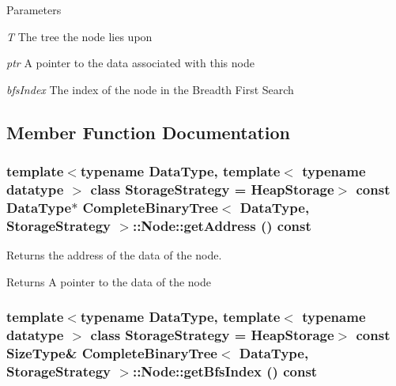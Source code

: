 \begin{DoxyParams}{Parameters}
\item[{\em T}]The tree the node lies upon \item[{\em ptr}]A pointer to the data associated with this node \item[{\em bfsIndex}]The index of the node in the Breadth First Search \end{DoxyParams}


\subsection{Member Function Documentation}
\hypertarget{class_complete_binary_tree_1_1_node_a78c55b78241e27d27361b250cf77deb8}{
\subsubsection[{getAddress}]{\setlength{\rightskip}{0pt plus 5cm}template$<$typename DataType, template$<$ typename datatype $>$ class StorageStrategy = HeapStorage$>$ const DataType$\ast$ {\bf CompleteBinaryTree}$<$ DataType, StorageStrategy $>$::Node::getAddress () const}}
\label{class_complete_binary_tree_1_1_node_a78c55b78241e27d27361b250cf77deb8}


Returns the address of the data of the node. 

\begin{DoxyReturn}{Returns}
A pointer to the data of the node 
\end{DoxyReturn}
\hypertarget{class_complete_binary_tree_1_1_node_a5d57f8452e31eb8680fb186655b840c3}{
\subsubsection[{getBfsIndex}]{\setlength{\rightskip}{0pt plus 5cm}template$<$typename DataType, template$<$ typename datatype $>$ class StorageStrategy = HeapStorage$>$ const SizeType\& {\bf CompleteBinaryTree}$<$ DataType, StorageStrategy $>$::Node::getBfsIndex () const}}
\label{class_complete_binary_tree_1_1_node_a5d57f8452e31eb8680fb186655b840c3}


